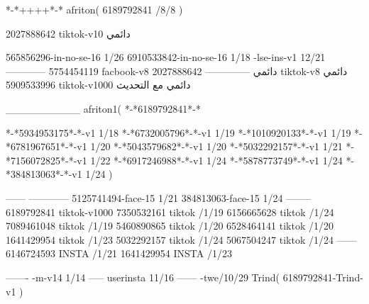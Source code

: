 *-*++++*-*
afriton(
6189792841 /8/8
)

2027888642 tiktok-v10
دائمي

565856296-in-no-se-16 1/26
6910533842-in-no-se-16 1/18
-lse-ins-v1 12/21
------------
5754454119 facbook-v8
دائمي
--------------
2027888642 tiktok-v8
دائمي
5909533996 tiktok-v1000
دائمي مع التحديث

__________
afriton1(
*-*6189792841*-*


*-*5934953175*-*-v1 1/18
*-*6732005796*-*-v1 1/19
*-*1010920133*-*-v1 1/19
*-*6781967651*-*-v1 1/20
*-*5043579682*-*-v1 1/20
*-*5032292157*-*-v1 1/21
*-*7156072825*-*-v1 1/22
*-*6917246988*-*-v1 1/24
*-*5878773749*-*-v1 1/24
*-*384813063*-*-v1 1/24
)

------
------------
5125741494-face-15 1/21
384813063-face-15 1/24
--------
6189792841 tiktok-v1000
7350532161 tiktok /1/19
6156665628 tiktok /1/24
7089461048 tiktok /1/19
5460890865 tiktok /1/20
6528464141 tiktok /1/20
1641429954 tiktok /1/23
5032292157 tiktok /1/24
5067504247 tiktok /1/24
------
6146724593 INSTA /1/21
1641429954 INSTA /1/23

-------
-m-v14 1/14
-----
userinsta 11/16
------
-twe/10/29
Trind(
6189792841-Trind-v1 
)
